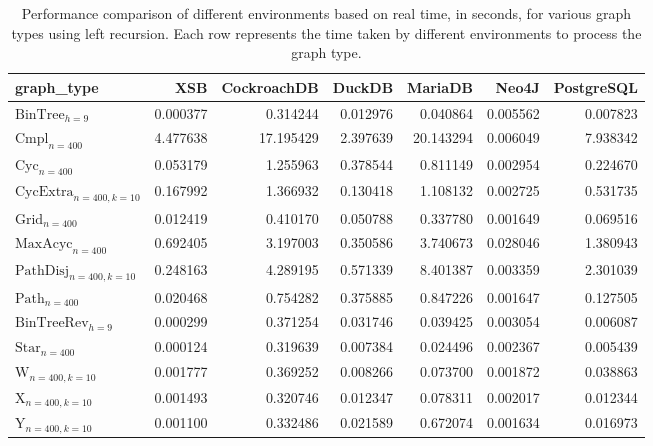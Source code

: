 \begin{table}
\caption{Performance comparison of different environments based on real time, in seconds, for various graph types using left recursion. Each row represents the time taken by different environments to process the graph type.}
\label{table:results}
\begin{tabular}{lrrrrrr}
\toprule
graph\_type & XSB & CockroachDB & DuckDB & MariaDB & Neo4J & PostgreSQL \\
\midrule
$\text{BinTree}_{h=9}$ & 0.000377 & 0.314244 & 0.012976 & 0.040864 & 0.005562 & 0.007823 \\
$\text{Cmpl}_{n=400}$ & 4.477638 & 17.195429 & 2.397639 & 20.143294 & 0.006049 & 7.938342 \\
$\text{Cyc}_{n=400}$ & 0.053179 & 1.255963 & 0.378544 & 0.811149 & 0.002954 & 0.224670 \\
$\text{CycExtra}_{n=400,k=10}$ & 0.167992 & 1.366932 & 0.130418 & 1.108132 & 0.002725 & 0.531735 \\
$\text{Grid}_{n=400}$ & 0.012419 & 0.410170 & 0.050788 & 0.337780 & 0.001649 & 0.069516 \\
$\text{MaxAcyc}_{n=400}$ & 0.692405 & 3.197003 & 0.350586 & 3.740673 & 0.028046 & 1.380943 \\
$\text{PathDisj}_{n=400,k=10}$ & 0.248163 & 4.289195 & 0.571339 & 8.401387 & 0.003359 & 2.301039 \\
$\text{Path}_{n=400}$ & 0.020468 & 0.754282 & 0.375885 & 0.847226 & 0.001647 & 0.127505 \\
$\text{BinTreeRev}_{h=9}$ & 0.000299 & 0.371254 & 0.031746 & 0.039425 & 0.003054 & 0.006087 \\
$\text{Star}_{n=400}$ & 0.000124 & 0.319639 & 0.007384 & 0.024496 & 0.002367 & 0.005439 \\
$\text{W}_{n=400,k=10}$ & 0.001777 & 0.369252 & 0.008266 & 0.073700 & 0.001872 & 0.038863 \\
$\text{X}_{n=400, k=10}$ & 0.001493 & 0.320746 & 0.012347 & 0.078311 & 0.002017 & 0.012344 \\
$\text{Y}_{n=400,k=10}$ & 0.001100 & 0.332486 & 0.021589 & 0.672074 & 0.001634 & 0.016973 \\
\bottomrule
\end{tabular}
\end{table}
